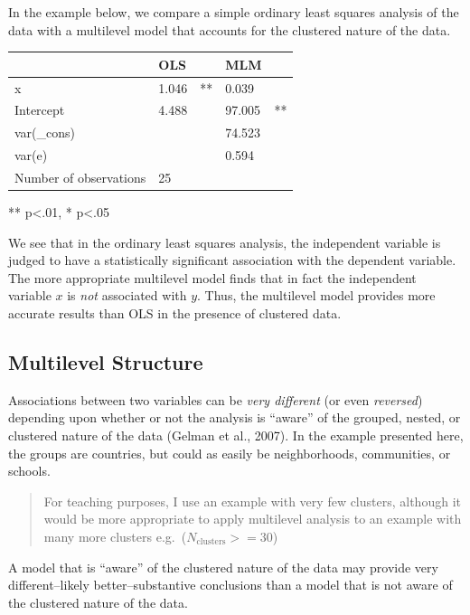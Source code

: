 \documentclass[
  letterpaper,
  DIV=11,
  numbers=noendperiod]{scrreprt}
\begin{document}
In the example below, we compare a simple ordinary least squares
analysis of the data with a multilevel model that accounts for the
clustered nature of the data.

\begin{longtable}[]{@{}lllll@{}}
\toprule\noalign{}
& OLS & & MLM & \\
\midrule\noalign{}
\endhead
\bottomrule\noalign{}
\endlastfoot
x & 1.046 & ** & 0.039 & \\
Intercept & 4.488 & & 97.005 & ** \\
var(\_cons) & & & 74.523 & \\
var(e) & & & 0.594 & \\
Number of observations & 25 & & & \\
\end{longtable}

** p\textless.01, * p\textless.05

We see that in the ordinary least squares analysis, the independent
variable is judged to have a statistically significant association with
the dependent variable. The more appropriate multilevel model finds that
in fact the independent variable \(x\) is \emph{not} associated with
\(y\). Thus, the multilevel model provides more accurate results than
OLS in the presence of clustered data.

\subsection{Multilevel Structure}\label{sec-multilevelstructure}

Associations between two variables can be \emph{very different} (or even
\emph{reversed}) depending upon whether or not the analysis is ``aware''
of the grouped, nested, or clustered nature of the data (Gelman et al.,
2007). In the example presented here, the groups are countries, but
could as easily be neighborhoods, communities, or schools.

\begin{quote}
For teaching purposes, I use an example with very few clusters, although
it would be more appropriate to apply multilevel analysis to an example
with many more clusters e.g.~(\(N_\text{clusters} >= 30\))
\end{quote}

A model that is ``aware'' of the clustered nature of the data may
provide very different--likely better--substantive conclusions than a
model that is not aware of the clustered nature of the data.
 
\end{document}
